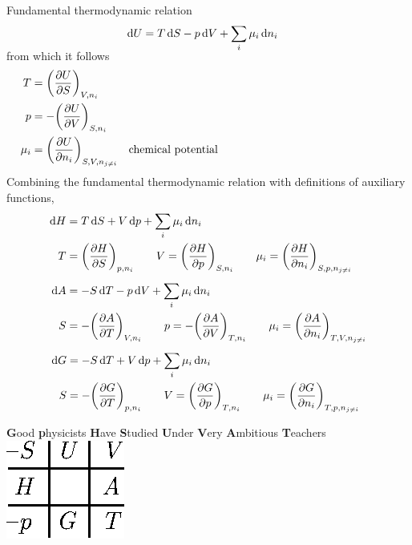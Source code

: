 \documentclass[11pt,a4paper,twoside]{article}
\numberwithin{equation}{section}
\begin{document}
Fundamental thermodynamic relation
\begin{align}
    \label{eq:thermo-fundamental}
    \dd{U} & = T\dd{S} - p \dd{V} + \smash[b]{\sum_{i}} \, \mu_{i} \dd{n}_i
\end{align}
from which it follows
\begin{align}
    T & = \qty(\pdv{U}{S})_{V,n_i} & & \\
    p & = -\qty(\pdv{U}{V})_{S,n_i} & & \\
    \mu_{i} & = \qty(\pdv{U}{n_{i}})_{S,V,n_{j\neq i}} 
        & & \text{chemical potential \hspace*{0.45\columnwidth}}
\end{align}
Combining the fundamental thermodynamic relation with definitions of auxiliary functions,
\begin{align}
    & \begin{aligned}
        \dd{H} & = T\dd{S} + V \dd{p} +  \sum_{i} \mu_{i} \dd{n}_i \\
        T & = \qty(\pdv{H}{S})_{p,n_i} \qquad
        V = \qty(\pdv{H}{p})_{S,n_i} \qquad
        \mu_{i} = \qty(\pdv{H}{n_i})_{S,p,n_{j\neq i}} 
    \end{aligned} \\ 
    & \begin{aligned}
        \rule{0pt}{1.5em}
        \dd{A} & = -S\dd{T} - p \dd{V} +  \sum_{i} \mu_{i} \dd{n}_i \\
        S & = -\qty(\pdv{A}{T})_{V,n_i} \qquad
        p = -\qty(\pdv{A}{V})_{T,n_i} \qquad
        \mu_{i} = \qty(\pdv{A}{n_i})_{T,V,n_{j\neq i}} 
    \end{aligned} \\ 
    & \begin{aligned}
        \rule{0pt}{1.5em}
        \dd{G} & = -S\dd{T} + V \dd{p} +  \sum_{i} \mu_{i} \dd{n}_i \\
        S & = -\qty(\pdv{G}{T})_{p,n_i} \qquad
        V = \qty(\pdv{G}{p})_{T,n_i} \qquad
        \mu_{i} = \qty(\pdv{G}{n_i})_{T,p,n_{j\neq i}} 
    \end{aligned} \label{eq:gibbs-master}
\end{align}


\begin{framed}
    \centering
    \textbf{G}ood \textbf{p}hysicists \textbf{H}ave \textbf{S}tudied \textbf{U}nder \textbf{V}ery \textbf{A}mbitious \textbf{T}eachers\\[1em]

    \includegraphics[scale=1.2]{thermo_square.eps}
    \end{framed}
\end{document}
